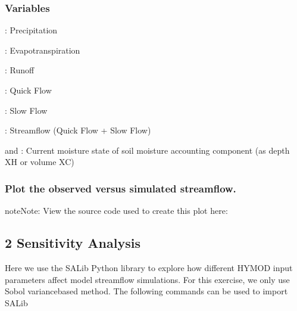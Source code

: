 \documentclass[letterpaper,10pt,english]{book}
\let\sphinxpxdimen\pdfpxdimen\else\newdimen\sphinxpxdimen
\begin{document}
\subsubsection{Variables}
\label{\detokenize{A2_Jupyter_Notebooks:variables}}
\sphinxAtStartPar
{}: Precipitation

\sphinxAtStartPar
{}: Evapotranspiration

\sphinxAtStartPar
{}: Runoff

\sphinxAtStartPar
{}: Quick Flow

\sphinxAtStartPar
{}: Slow Flow

\sphinxAtStartPar
{}: Streamflow (Quick Flow + Slow Flow)

\sphinxAtStartPar
{} and : Current moisture state of soil moisture
accounting component (as depth XH or volume XC)


\subsubsection{Plot the observed versus simulated streamflow.}
\label{\detokenize{A2_Jupyter_Notebooks:plot-the-observed-versus-simulated-streamflow}}
\begin{sphinxadmonition}{note}{Note:}
\sphinxAtStartPar
{} View the source code used to create this plot here:  
\end{sphinxadmonition}

\begin{sphinxVerbatim}[commandchars=\\\{\}]
   
\end{sphinxVerbatim}

\noindent\sphinxincludegraphics[width=718\sphinxpxdimen,height=384\sphinxpxdimen]{{output_16_0}.png}


\subsection{2\sphinxhyphen{} Sensitivity Analysis}
\label{\detokenize{A2_Jupyter_Notebooks:sensitivity-analysis}}
\sphinxAtStartPar
Here we use the SALib Python library to explore how different HYMOD
input parameters affect model streamflow simulations. For this exercise,
we only use Sobol variance\sphinxhyphen{}based method. The following commands can be
used to import SALib
\end{document}
